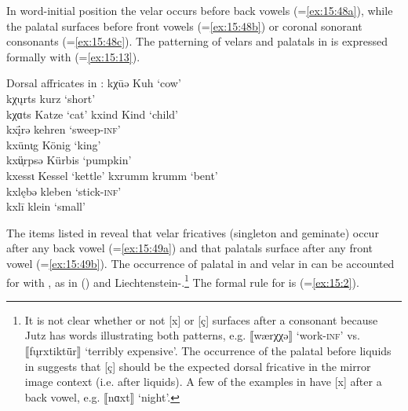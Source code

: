 In word-initial position the velar  occurs before back vowels (=\ref{ex:15:48a}), while the palatal  surfaces before front vowels (=\ref{ex:15:48b}) or coronal sonorant consonants (=\ref{ex:15:48c}). The patterning of velars and palatals in  is expressed formally with  (=\ref{ex:15:13}).

\ea%
\label{ex:15:48}Dorsal affricates in :
\ea\label{ex:15:48a} kχūə \tab [kxuːə] \tab Kuh \tab ‘cow’ \\
    kχ\k{u}rts \tab [kxʊrts] \tab kurz \tab ‘short’ \\
    kχɑts \tab [kxɑts] \tab Katze \tab ‘cat’ 
\ex\label{ex:15:48b} kxind \tab [kçind] \tab Kind \tab ‘child’ \\
    kx\={į}rə \tab [kçɪːrə] \tab kehren \tab ‘sweep-\textsc{inf}’ \\
    kxünɩg \tab [kçynɪg] \tab König \tab ‘king’ \\
    kxü̜rpsə \tab [kçʏrpsə] \tab Kürbis \tab ‘pumpkin’ \\
    kxessɩ \tab [kçessɪ] \tab Kessel \tab ‘kettle’ 
\ex\label{ex:15:48c} kxrumm \tab [kçrumm] \tab krumm \tab ‘bent’ \\
    kxlębə \tab [kçlɛbə] \tab kleben \tab ‘stick-\textsc{inf}’ \\
    kxlī \tab [kçliː] \tab klein \tab  ‘small’ 
    \z
\z 

The items listed in  reveal that velar fricatives (singleton and geminate) occur after any back vowel (=\ref{ex:15:49a}) and that palatals surface after any front vowel (=\ref{ex:15:49b}). The occurrence of palatal in  and velar in  can be accounted for with , as in  () and Liechtenstein-.\footnote{{It is not clear whether or not [x] or [ç] surfaces after a consonant because Jutz has words illustrating both patterns, e.g. ⟦wærχχə⟧ ‘work-}\textrm{\textsc{inf}}\textrm{’ vs. ⟦f\k{u}rxtikt\={ü}r⟧ ‘terribly expensive’. The occurrence of the palatal  before liquids in  suggests that [ç] should be the expected dorsal fricative in the mirror image context (i.e. after liquids). A few of the examples in \citet{Jutz1922} have [x] after a back vowel, e.g. ⟦nɑxt⟧ ‘night’.}} The formal rule for  is  (=\ref{ex:15:2}).\largerpage[-1]\pagebreak

